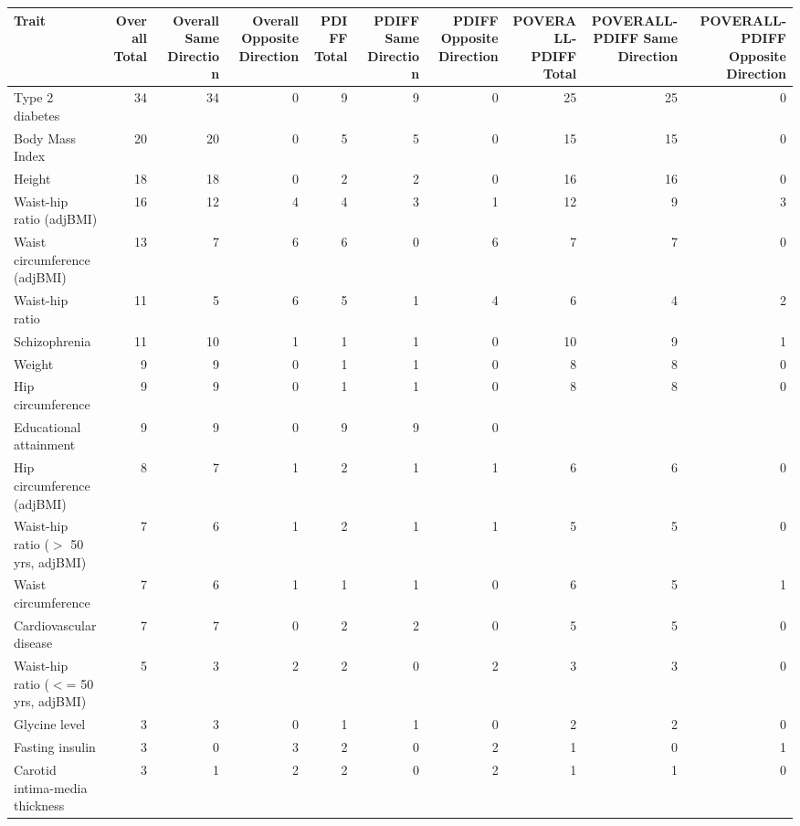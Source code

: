 \begin{table}[ht]
\centering
\begin{tabular}{lrrrrrrrrr}
  \hline
Trait & Overall Total & Overall Same Direction & Overall Opposite Direction & PDIFF Total & PDIFF Same Direction & PDIFF Opposite Direction & POVERALL-PDIFF Total & POVERALL-PDIFF Same Direction & POVERALL-PDIFF Opposite Direction \\ 
  \hline
Type 2 diabetes &  34 &  34 &   0 &   9 &   9 &   0 &  25 &  25 &   0 \\ 
  Body Mass Index &  20 &  20 &   0 &   5 &   5 &   0 &  15 &  15 &   0 \\ 
  Height &  18 &  18 &   0 &   2 &   2 &   0 &  16 &  16 &   0 \\ 
  Waist-hip ratio (adjBMI) &  16 &  12 &   4 &   4 &   3 &   1 &  12 &   9 &   3 \\ 
  Waist circumference (adjBMI) &  13 &   7 &   6 &   6 &   0 &   6 &   7 &   7 &   0 \\ 
  Waist-hip ratio &  11 &   5 &   6 &   5 &   1 &   4 &   6 &   4 &   2 \\ 
  Schizophrenia &  11 &  10 &   1 &   1 &   1 &   0 &  10 &   9 &   1 \\ 
  Weight &   9 &   9 &   0 &   1 &   1 &   0 &   8 &   8 &   0 \\ 
  Hip circumference &   9 &   9 &   0 &   1 &   1 &   0 &   8 &   8 &   0 \\ 
  Educational attainment &   9 &   9 &   0 &   9 &   9 &   0 &  &  &  \\ 
  Hip circumference (adjBMI) &   8 &   7 &   1 &   2 &   1 &   1 &   6 &   6 &   0 \\ 
  Waist-hip ratio ($>$ 50 yrs, adjBMI) &   7 &   6 &   1 &   2 &   1 &   1 &   5 &   5 &   0 \\ 
  Waist circumference &   7 &   6 &   1 &   1 &   1 &   0 &   6 &   5 &   1 \\ 
  Cardiovascular disease &   7 &   7 &   0 &   2 &   2 &   0 &   5 &   5 &   0 \\ 
  Waist-hip ratio ($<$= 50 yrs, adjBMI) &   5 &   3 &   2 &   2 &   0 &   2 &   3 &   3 &   0 \\ 
  Glycine level &   3 &   3 &   0 &   1 &   1 &   0 &   2 &   2 &   0 \\ 
  Fasting insulin &   3 &   0 &   3 &   2 &   0 &   2 &   1 &   0 &   1 \\ 
  Carotid intima-media thickness &   3 &   1 &   2 &   2 &   0 &   2 &   1 &   1 &   0 \\ 

\end{tabular}
\end{table}
